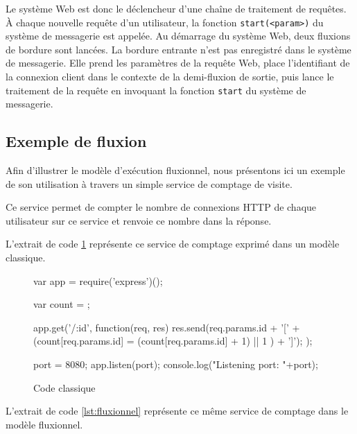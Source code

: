 Le système Web est donc le déclencheur d'une chaîne de traitement de requêtes.
À chaque nouvelle requête d'un utilisateur, la fonction \texttt{start(<param>)} du système de messagerie est appelée.
Au démarrage du système Web, deux fluxions de bordure sont lancées.
La bordure entrante n'est pas enregistré dans le système de messagerie.
Elle prend les paramètres de la requête Web, place l'identifiant de la connexion client dans le contexte de la demi-fluxion de sortie, puis lance le traitement de la requête en invoquant la fonction \texttt{start} du système de messagerie.

\subsection{Exemple de fluxion}

Afin d'illustrer le modèle d'exécution fluxionnel, nous présentons ici un exemple de son utilisation à travers un simple service de comptage de visite.

Ce service permet de compter le nombre de connexions HTTP de chaque utilisateur sur ce service et renvoie ce nombre dans la réponse.

L'extrait de code \ref{lst:classique} représente ce service de comptage exprimé dans un modèle classique.

\begin{figure}
  \begin{code}
  var app = require('express')();

  var count = {};

  app.get('/:id', function(req, res){
    res.send(req.params.id + '[' + (count[req.params.id] = (count[req.params.id] + 1) || 1 ) + ']');
  });

  port = 8080;
  app.listen(port);
  console.log("Listening port: "+port);
  \end{code}
  \caption{Code classique}
  \label{lst:classique}
\end{figure}

L'extrait de code \ref{lst:fluxionnel} représente ce même service de comptage dans le modèle fluxionnel.

